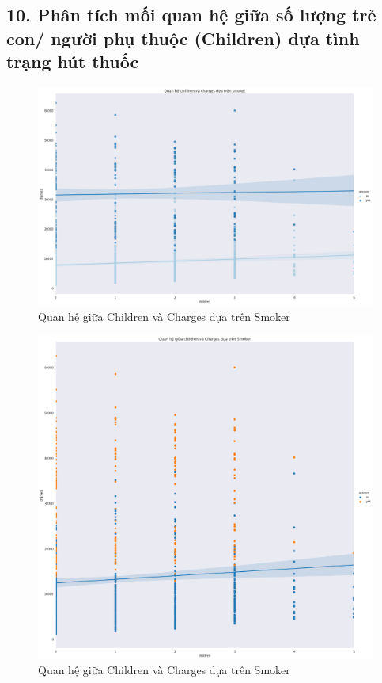 \documentclass{article}
\begin{document}
	\subsection{10. Phân tích mối quan hệ giữa số lượng trẻ con/ người phụ thuộc (Children) dựa tình trạng hút thuốc}
	\begin{figure}[H]
		\centering
		\includegraphics[width=1\textwidth]{images/children_charges_by_smoker.png}
		\caption{Quan hệ giữa Children và Charges dựa trên Smoker}
		\label{fig:writing-thesis}
	\end{figure}
	\begin{figure}[H]
		\centering
		\includegraphics[width=1\textwidth]{images/reg_children_charges_by_smoker.png}
		\caption{Quan hệ giữa Children và Charges dựa trên Smoker}
		\label{fig:writing-thesis}
	\end{figure}
	
\end{document}
